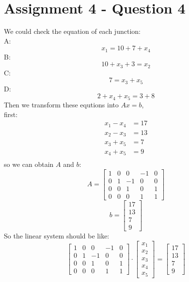\documentclass{article}
\begin{document}
\section*{Assignment 4 - Question 4}
We could check the equation of each junction:\\
A:
$$
x_1 = 10 + 7 + x_4
$$
B:
$$
10 + x_3 + 3 = x_2
$$
C:
$$
7 = x_3 + x_5
$$
D:
$$
2 + x_4 + x_5 = 3 + 8
$$
Then we transform these equtions into $Ax = b$,\\
first:
\begin{align*}
    x_1 - x_4 &= 17\\
    x_2 - x_3 &= 13\\
    x_3 + x_5 &= 7\\
    x_4 + x_5 &= 9\\
\end{align*}
so we can obtain $A$ and $b$:
$$
A = 
\begin{bmatrix}
 1 & 0 & 0 & -1 & 0\\
 0 & 1 & -1 & 0 & 0\\
 0 & 0 & 1 & 0 & 1\\
 0 & 0 & 0 & 1 & 1   
\end{bmatrix} 
$$
$$
b = 
\begin{bmatrix}
    17\\
    13\\
    7\\
    9
\end{bmatrix}
$$
So the linear system should be like:
$$
\begin{bmatrix}
    1 & 0 & 0 & -1 & 0\\
    0 & 1 & -1 & 0 & 0\\
    0 & 0 & 1 & 0 & 1\\
    0 & 0 & 0 & 1 & 1   
\end{bmatrix} 
\cdot
\begin{bmatrix}
    x_1\\
    x_2\\
    x_3\\
    x_4\\
    x_5
\end{bmatrix}
=
\begin{bmatrix}
    17\\
    13\\
    7\\
    9
\end{bmatrix}
$$
\end{document}
